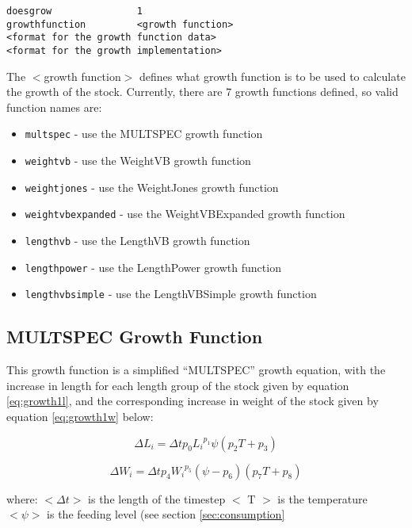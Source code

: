 \documentclass[]{book}
\providecommand{\tightlist}{%
  \setlength{\itemsep}{0pt}\setlength{\parskip}{0pt}}
\begin{document}
\begin{verbatim}
doesgrow               1
growthfunction         <growth function>
<format for the growth function data>
<format for the growth implementation>
\end{verbatim}

The \(<\)growth function\(>\) defines what growth function is to be used to
calculate the growth of the stock. Currently, there are 7 growth
functions defined, so valid function names are:

\begin{itemize}
\tightlist
\item
  \texttt{multspec} - use the MULTSPEC growth function
\item
  \texttt{weightvb} - use the WeightVB growth function
\item
  \texttt{weightjones} - use the WeightJones growth function
\item
  \texttt{weightvbexpanded} - use the WeightVBExpanded growth function
\item
  \texttt{lengthvb} - use the LengthVB growth function
\item
  \texttt{lengthpower} - use the LengthPower growth function
\item
  \texttt{lengthvbsimple} - use the LengthVBSimple growth function
\end{itemize}

\hypertarget{subsec:growth1}{%
\subsection{MULTSPEC Growth Function}\label{subsec:growth1}}

This growth function is a simplified ``MULTSPEC'' growth equation, with
the increase in length for each length group of the stock given by
equation \eqref{eq:growth1l}, and the corresponding increase in weight of
the stock given by equation \eqref{eq:growth1w} below:

\begin{equation}
\label{eq:growth1l}
\Delta L_{i} = \Delta t p_{0} {L_{i}}^{p_{1}} \psi (p_{2} T + p_{3})
\end{equation}

\begin{equation}
\label{eq:growth1w}
\Delta W_{i} = \Delta t p_{4} {W_{i}}^{p_{5}} (\psi - p_{6}) (p_{7} T + p_{8})\end{equation}

where: \(<\Delta t>\) is the length of the timestep \(<\) T \(>\) is the
temperature \(<\psi>\) is the feeding level (see
section \ref{sec:consumption}
\end{document}

